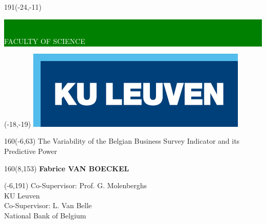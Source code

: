 \documentclass[12pt,a4paper,oneside]{book}
\begin{document}
\thispagestyle{empty}
\newcommand{\form}[1]{\scalebox{1.087}{\boldmath{#1}}}
\sffamily
%
\begin{textblock}{191}(-24,-11)
\colorbox{green}{\hspace{139mm}\ \parbox[c][18truemm]{52mm}{\textcolor{white}{FACULTY OF SCIENCE}}}
\end{textblock}
%
\begin{textblock}{70}(-18,-19)
\textblockcolour{}
\includegraphics*[height=19.8truemm]{Images/LogoKULeuven.png}
\end{textblock}
%
\begin{textblock}{160}(-6,63)
\textblockcolour{}
\vspace{-\parskip}
\flushleft
\fontsize{40}{42}\selectfont \textcolor{bluetitle}{The Variability of the Belgian Business Survey Indicator and its Predictive Power}\\[1.5mm]
\end{textblock}
%
%
\begin{textblock}{160}(8,153)
\textblockcolour{}
\vspace{-\parskip}
\flushright
\fontsize{14}{16}\selectfont \textbf{Fabrice VAN BOECKEL}
\end{textblock}
%
\begin{textblock}{70}(-6,191)
\textblockcolour{}
\vspace{-\parskip}
\flushleft
Co-Supervisor: Prof. G. Molenberghs\\[-2pt]
\textcolor{blueaff}{KU Leuven}\\[5pt]
Co-Supervisor: L. Van Belle\\[-2pt]
\textcolor{blueaff}{National Bank of Belgium}\\[5pt]
\end{textblock}
\end{document}
